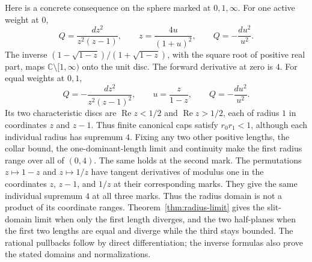 \documentclass[11pt,a4paper]{article}
\theoremstyle{definition}
\newcommand{\C}{\mathbb C}
\begin{document}
Here is a concrete consequence on the sphere marked at $0,1,\infty$. For one active weight at $0$,
\[
 Q=\frac{dz^2}{z^2(z-1)},\qquad z=\frac{4u}{(1+u)^2},
 \qquad Q=-\frac{du^2}{u^2}.
\]
The inverse $(1-\sqrt{1-z})/(1+\sqrt{1-z})$, with the square root of positive real part, maps $\C\setminus[1,\infty)$ onto the unit disc. The forward derivative at zero is $4$. For equal weights at $0,1$,
\[
 Q=-\frac{dz^2}{z^2(z-1)^2},\qquad u=\frac z{1-z},
 \qquad Q=-\frac{du^2}{u^2}.
\]
Its two characteristic discs are $\operatorname{Re}z<1/2$ and $\operatorname{Re}z>1/2$, each of radius $1$ in coordinates $z$ and $z-1$. Thus finite canonical caps satisfy $r_0r_1<1$, although each individual radius has supremum $4$. Fixing any two other positive lengths, the collar bound, the one-dominant-length limit and continuity make the first radius range over all of $(0,4)$. The same holds at the second mark. The permutations $z\mapsto1-z$ and $z\mapsto1/z$ have tangent derivatives of modulus one in the coordinates $z$, $z-1$, and $1/z$ at their corresponding marks. They give the same individual supremum $4$ at all three marks. Thus the radius domain is not a product of its coordinate ranges. Theorem~\ref{thm:radius-limit} gives the slit-domain limit when only the first length diverges, and the two half-planes when the first two lengths are equal and diverge while the third stays bounded. The rational pullbacks follow by direct differentiation; the inverse formulas also prove the stated domains and normalizations.
\end{document}
